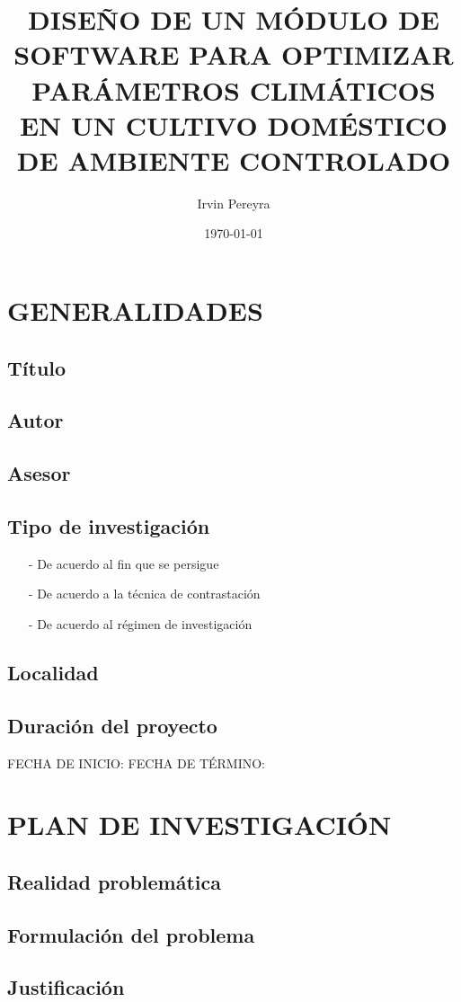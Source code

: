 \documentclass{report}
\title{DISEÑO DE UN MÓDULO DE SOFTWARE PARA OPTIMIZAR PARÁMETROS CLIMÁTICOS EN
  UN CULTIVO DOMÉSTICO DE AMBIENTE CONTROLADO}
\author{Irvin Pereyra}
\date{\today}
\begin{document}
\tableofcontents
{}

\section{GENERALIDADES}
\subsection{Título}
\subsection{Autor}
\subsection{Asesor}
\subsection{Tipo de investigación}
\begin{enumerate}
\item[-] De acuerdo al fin que se persigue
\item[-] De acuerdo a la técnica de contrastación
\item[-] De acuerdo al régimen de investigación
\end{enumerate}
\subsection{Localidad}
\subsection{Duración del proyecto}
FECHA DE INICIO:
FECHA DE TÉRMINO:

\section{PLAN DE INVESTIGACIÓN}
\subsection{Realidad problemática}
\subsection{Formulación del problema}
\subsection{Justificación}
\end{document}
